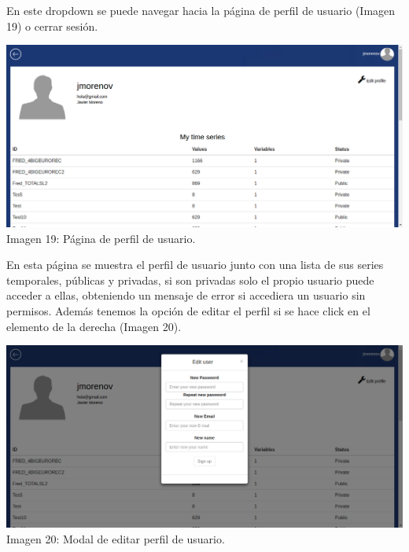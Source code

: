 \documentclass[14pt]{extarticle}
\theoremstyle{definition}
\theoremstyle{remark}
\begin{document}
En este dropdown se puede navegar hacia la página de perfil de usuario (Imagen 19) o cerrar sesión.

\begin{center}
\includegraphics[scale=0.35]{ProfileUserPage.png}
\\Imagen 19: Página de perfil de usuario.
\end{center}
En esta página se muestra el perfil de usuario junto con una lista de sus series temporales, públicas y privadas, si son privadas solo el propio usuario puede acceder a ellas, obteniendo un mensaje de error si accediera un usuario sin permisos. Además tenemos la opción de editar el perfil si se hace click en el elemento de la derecha (Imagen 20).
\begin{center}
\includegraphics[scale=0.35]{EditUserProfile.png}
\\Imagen 20: Modal de editar perfil de usuario.
\end{center}
\newpage
\end{document}
